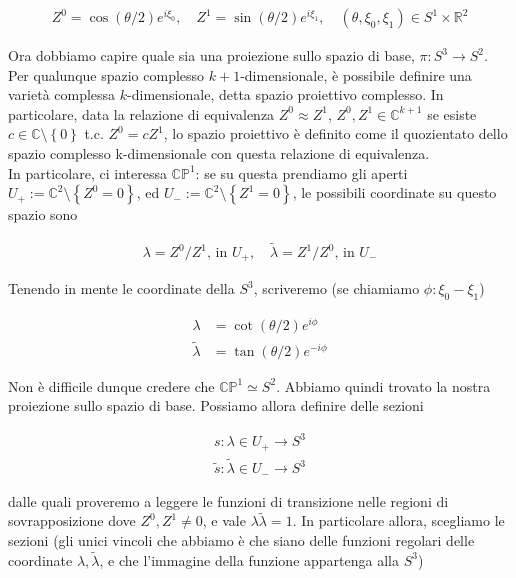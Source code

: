 \documentclass{report}
\begin{document}
\begin{align}
    Z^0 = \cos (\theta/2)e^{i\xi_0}, \quad Z^1 = \sin(\theta/2)e^{i\xi_1}, \quad (\theta, \xi_0, \xi_1) \in S^1 \times \mathbb{R}^2
\end{align}

Ora dobbiamo capire quale sia una proiezione sullo spazio di base, \(\pi: S^3 \rightarrow S^2\). \\

Per qualunque spazio complesso \(k+1\)-dimensionale, è possibile definire una varietà complessa \(k\)-dimensionale, detta spazio proiettivo complesso. In particolare, data la relazione di equivalenza \(Z^0 \approx Z^1\), \(Z^0, Z^1 \in \mathbb{C}^{k+1}\) se esiste \(c \in \mathbb{C}\setminus \left\{0\right\}\) t.c. \(Z^0 = cZ^1\), lo spazio proiettivo è definito come il quozientato dello spazio complesso k-dimensionale con questa relazione di equivalenza. \\

In particolare, ci interessa \(\mathbb{CP}^1\): se su questa prendiamo gli aperti \(U_+ := \mathbb{C}^2 \setminus \left\{Z^0 = 0\right\}\), ed \(U_- := \mathbb{C}^2 \setminus \left\{Z^1 = 0\right\}\), le possibili coordinate su questo spazio sono 

\begin{align}
    \lambda = Z^0/Z^1, \, \text{in } U_+, \quad \tilde{\lambda} = Z^1/Z^0, \, \text{in } U_-
\end{align}

Tenendo in mente le coordinate della \(S^3\), scriveremo (se chiamiamo \(\phi: \xi_0-\xi_1\))

\begin{align}
    \lambda &= \cot(\theta/2)e^{i\phi} \\
    \tilde{\lambda} &= \tan(\theta/2)e^{-i\phi}
\end{align}


Non è difficile dunque credere che \(\mathbb{CP}^1 \simeq S^2\). Abbiamo quindi trovato la nostra proiezione sullo spazio di base. Possiamo allora definire delle sezioni 

\begin{align}
    s: \lambda \in U_+ \rightarrow S^3 \\
    \tilde{s}: \tilde{\lambda} \in U_- \rightarrow S^3
\end{align}

dalle quali proveremo a leggere le funzioni di transizione nelle regioni di sovrapposizione dove \(Z^0, Z^1 \neq 0\), e vale \(\lambda \tilde{\lambda} = 1\). In particolare allora, scegliamo le sezioni (gli unici vincoli che abbiamo è che siano delle funzioni regolari delle coordinate \(\lambda, \tilde{\lambda}\), e che l'immagine della funzione appartenga alla \(S^3\))
\end{document}
